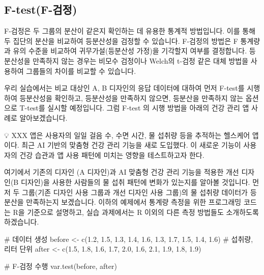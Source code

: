 \documentclass[
  letterpaper,
]{book}
\newenvironment{Shaded}{\begin{snugshade}}{\end{snugshade}}
\newcommand{\CommentTok}[1]{\textcolor[rgb]{0.37,0.37,0.37}{#1}}
\newcommand{\FloatTok}[1]{\textcolor[rgb]{0.68,0.00,0.00}{#1}}
\newcommand{\FunctionTok}[1]{\textcolor[rgb]{0.28,0.35,0.67}{#1}}
\newcommand{\NormalTok}[1]{\textcolor[rgb]{0.00,0.23,0.31}{#1}}
\newcommand{\OtherTok}[1]{\textcolor[rgb]{0.00,0.23,0.31}{#1}}
\renewenvironment{Shaded}
    {\begin{snugshade}
    \begin{singlespace}
    \linespread{1}
    }
    {\end{singlespace}
    \end{snugshade}
}
\begin{document}
\subsection{F-test(F-검정)}\label{f-testf-uxac80uxc815}

F-검정은 두 그룹의 분산이 같은지 확인하는 데 유용한 통계적 방법입니다.
이를 통해 두 집단의 분산을 비교하여 등분산성을 검정할 수 있습니다.
F-검정의 방법은 F 통계량과 유의 수준을 비교하여 귀무가설(등분산성
가정)을 기각할지 여부를 결정합니다. 등분산성을 만족하지 않는 경우는
비모수 검정이나 Welch의 t-검정 같은 대체 방법을 사용하여 그룹들의 차이를
비교할 수 있습니다.

우리 실습에서는 비교 대상인 A, B 디자인의 응답 데이터에 대하여 먼저
F-test를 시행하여 등분산성을 확인하고, 등분산성을 만족하지 않으면,
등분산을 만족하지 않는 옵션으로 T-test를 실시할 예정입니다. 그럼 F-test
의 시행 방법을 아래의 건강 관리 앱 사례로 알아보겠습니다.

💡 XXX 앱은 사용자의 일일 걸음 수, 수면 시간, 물 섭취량 등을 추적하는
헬스케어 앱이다. 최근 AI 기반의 맞춤형 건강 관리 기능을 새로 도입했다.
이 새로운 기능이 사용자의 건강 습관과 앱 사용 패턴에 미치는 영향을
테스트하고자 한다.

여기에서 기존의 디자인 (A 디자인)과 AI 맞춤형 건강 관리 기능을 적용한
개선 디자인(B 디자인)을 사용한 사람들의 물 섭취 패턴에 변화가 있는지를
알아볼 것입니다. 먼저 두 그룹(기존 디자인 사용 그룹과 개선 디자인 사용
그룹)의 물 섭취량 데이터가 등분산을 만족하는지 보겠습니다. 이하의
예제에서 통계량 측정을 위한 프로그래밍 코드는 R을 기준으로 설명하고,
실습 과제에서는 R 이외의 다른 측정 방법들도 소개하도록 하겠습니다.

\begin{Shaded}
\begin{Highlighting}[]
\CommentTok{\# 데이터 생성}
\NormalTok{before }\OtherTok{\textless{}{-}} \FunctionTok{c}\NormalTok{(}\FloatTok{1.2}\NormalTok{, }\FloatTok{1.5}\NormalTok{, }\FloatTok{1.3}\NormalTok{, }\FloatTok{1.4}\NormalTok{, }\FloatTok{1.6}\NormalTok{, }\FloatTok{1.3}\NormalTok{, }\FloatTok{1.7}\NormalTok{, }\FloatTok{1.5}\NormalTok{, }\FloatTok{1.4}\NormalTok{, }\FloatTok{1.6}\NormalTok{)  }\CommentTok{\# 섭취량, 리터 단위}
\NormalTok{after }\OtherTok{\textless{}{-}} \FunctionTok{c}\NormalTok{(}\FloatTok{1.5}\NormalTok{, }\FloatTok{1.8}\NormalTok{, }\FloatTok{1.6}\NormalTok{, }\FloatTok{1.7}\NormalTok{, }\FloatTok{2.0}\NormalTok{, }\FloatTok{1.6}\NormalTok{, }\FloatTok{2.1}\NormalTok{, }\FloatTok{1.9}\NormalTok{, }\FloatTok{1.8}\NormalTok{, }\FloatTok{1.9}\NormalTok{)}

\CommentTok{\# F{-}검정 수행}
\FunctionTok{var.test}\NormalTok{(before, after)}
\end{Highlighting}
\end{Shaded}
\end{document}
